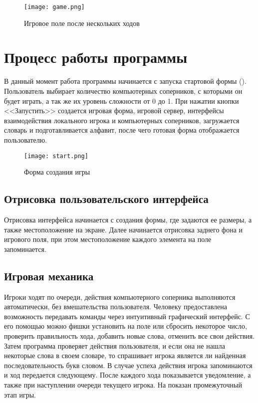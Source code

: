 \documentclass[a4paper,14pt]{article}
\begin{document}
	\begin{figure}[H]
		\centering
		\texttt{[image: game.png]}
		\caption{Игровое поле после нескольких ходов}
		\label{img:game}
	\end{figure}

\section{Процесс работы программы}
	В данный момент работа программы начинается с запуска стартовой формы ().
	Пользователь выбирает количество компьютерных соперников, с которыми он будет играть, а так же их уровень сложности от 0 до 1.
	При нажатии кнопки <<Запустить>> создается игровая форма, игровой сервер, интерфейсы взаимодействия локального игрока и компьютерных соперников, загружается словарь и подготавливается алфавит, после чего готовая форма отображается пользователю.

	\begin{figure}[H]
		\centering
		\texttt{[image: start.png]}
		\caption{Форма создания игры}
		\label{img:start}
	\end{figure}

	\subsection[Отрисовка интерфейса]{Отрисовка пользовательского интерфейса}
	Отрисовка интерфейса начинается с создания формы, где задаются ее размеры, а также местоположение на экране.
	Далее начинается отрисовка заднего фона и игрового поля, при этом местоположение каждого элемента на поле запоминается.
		
	\subsection{Игровая механика}
	Игроки ходят по очереди, действия компьютерного соперника выполняются автоматически, без вмешательства пользователя.
	Человеку предоставлена возможность передавать команды через интуитивный графический интерфейс.
	С его помощью можно фишки установить на поле или сбросить некоторое число, проверить правильность хода, добавить новые слова, отменить все свои действия.
	Затем программа проверяет действия пользователя, и если она не нашла некоторые слова в своем словаре, то спрашивает игрока является ли найденная последовательность букв словом.
	В случае успеха действия игрока запоминаются и ход передается следующему.
	После каждого хода показывается уведомление, а также при наступлении очереди текущего игрока. На  показан промежуточный этап игры.
	
\end{document}
